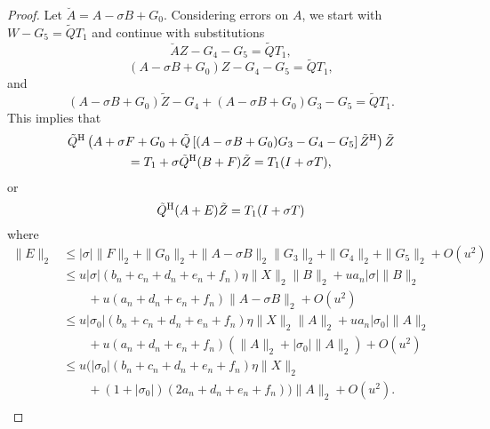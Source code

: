 \documentclass[12pt]{article}
\def\H{{\rm H}}
\begin{document}
\begin{proof}
  Let $\breve{A} = A-\sigma B + G_0$.  Considering errors on $A$, we
  start with $W - G_5 = \tilde{Q}T_1$ and continue with substitutions
  \begin{equation*}
    \breve{A}Z - G_4 - G_5 = \tilde{Q}T_1,
  \end{equation*}
  \begin{equation*}
    (A-\sigma B + G_0)Z - G_4 - G_5 = \tilde{Q}T_1,
  \end{equation*}
  and
  \begin{equation*}
    (A-\sigma B + G_0)\tilde{Z} - G_4 + (A-\sigma B+G_0) G_3 - G_5  = \tilde{Q}T_1.
  \end{equation*}
  This implies that
  \begin{multline*}
    \tilde{Q}^\H \left(A + \sigma F + G_0 + \tilde{Q} \left[(A-\sigma B+G_0) G_3- G_4 -G_5\right] \tilde{Z}^\H\right)
    \tilde{Z} \\
    = T_1 + \sigma \tilde{Q}^\H(B+F) \tilde{Z} = T_1 (I+\sigma T),
  \end{multline*}
  or
  \begin{equation*}
    \tilde{Q}^\H (A+E) \tilde{Z} = T_1(I+\sigma T)
  \end{equation*}
  where
  \begin{align*}
    \|E\|_2 
    & \leq |\sigma| \|F\|_2 + \|G_0\|_2 + \|A-\sigma B\|_2 \|G_3\|_2 + \|G_4\|_2 + \|G_5\|_2 + O(u^2) \\
    & \leq u |\sigma| (b_n + c_n + d_n + e_n + f_n) \eta \|X\|_2 \|B\|_2 + ua_n |\sigma| \|B\|_2 \\
    & \qquad + u(a_n + d_n+e_n+f_n) \|A-\sigma B\|_2 +O(u^2)\\
    & \leq u |\sigma_0| (b_n + c_n + d_n + e_n + f_n) \eta \|X\|_2 \|A\|_2 + ua_n |\sigma_0| \|A\|_2 \\
    & \qquad + u(a_n + d_n+e_n+f_n) (\|A\|_2 + |\sigma_0| \|A\|_2) +O(u^2)\\
    & \leq u \Big(|\sigma_0| (b_n + c_n + d_n + e_n + f_n) \eta \|X\|_2 \\
    & \qquad + (1+|\sigma_0|)(2a_n + d_n+e_n+f_n)\Big) \|A\|_2 +O(u^2).\\
  \end{align*}
\end{proof}
\end{document}
